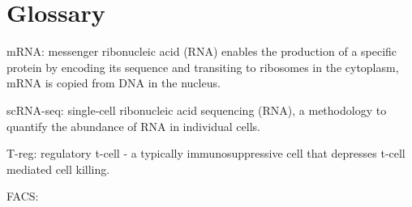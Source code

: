 \chapter[Glossary][GLossary]{Glossary}

mRNA: messenger ribonucleic acid (RNA) enables the production of a specific protein by encoding its sequence and transiting to ribosomes in the cytoplasm, mRNA is copied from DNA in the nucleus.

scRNA-seq: single-cell ribonucleic acid sequencing (RNA), a methodology to quantify the abundance of RNA in individual cells.  

T-reg: regulatory t-cell - a typically immunosuppressive cell that depresses t-cell mediated cell killing. 

FACS:


